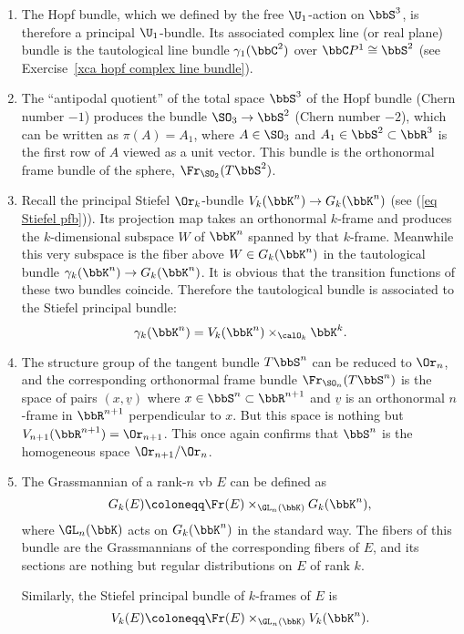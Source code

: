 \begin{example}
\begin{enumerate}
        \item The Hopf bundle, which we defined by the free $\U_1$-action on $\bbS^3$, is therefore a principal $\U_1$-bundle. Its associated complex line (or real plane) bundle is the tautological line bundle $\gamma_1(\bbC^2)$ over $\bbC P^1\cong\bbS^2$ (see Exercise~\ref{xca hopf complex line bundle}).
        
        \item The ``antipodal quotient'' of the total space $\bbS^3$ of the Hopf bundle (Chern number $-1$) produces the bundle $\SO_3\to \bbS^2$ (Chern number $-2$), which can be written as $\pi(A)=A_1$, where $A\in\SO_3$ and $A_1\in \bbS^2\subset \bbR^3$ is the first row of $A$ viewed as a unit vector. This bundle is the orthonormal frame bundle of the sphere, $\Fr_{\SO_2}(T\bbS^2)$.
        
        \item Recall the principal Stiefel $\Or_k$-bundle $V_k(\bbK^n)\to G_k(\bbK^n)$ (see (\ref{eq Stiefel pfb})). Its projection map takes an orthonormal $k$-frame and produces the $k$-dimensional subspace $W$ of $\bbK^n$ spanned by that $k$-frame. Meanwhile this very subspace is the fiber above $W\in G_k(\bbK^n)$ in the tautological bundle $\gamma_k(\bbK^n)\to G_k(\bbK^n)$. It is obvious that the transition functions of these two bundles coincide. Therefore the tautological bundle is associated to the Stiefel principal bundle:
        \[\gamma_k(\bbK^n)=V_k(\bbK^n)\times_{\calO_k}\bbK^k.\]

        \item The structure group of the tangent bundle $T\bbS^n$ can be reduced to $\Or_n$, and the corresponding orthonormal frame bundle $\Fr_{\SO_n}(T\bbS^n)$ is the space of pairs $(x,\underline{v})$ where $x\in\bbS^n\subset\bbR^{n+1}$ and $\underline{v}$ is an orthonormal $n$-frame in $\bbR^{n+1}$ perpendicular to $x$. But this space is nothing but $V_{n+1}(\bbR^{n+1})=\Or_{n+1}$. This once again confirms that $\bbS^n$ is the homogeneous space $\Or_{n+1}\slash \Or_n$.

        \item The Grassmannian of a rank-$n$ \gls{vb} $E$ can be defined as 
        \[G_k(E)\coloneqq \Fr(E)\times_{\GL_n(\bbK)} G_k(\bbK^n),\]
        where $\GL_n(\bbK)$ acts on $G_k(\bbK^n)$ in the standard way. The fibers of this bundle are the Grassmannians of the corresponding fibers of $E$, and its sections are nothing but regular distributions on $E$ of rank $k$. 
        
        Similarly, the Stiefel principal bundle of $k$-frames of $E$ is
        \[V_k(E)\coloneqq \Fr(E)\times_{\GL_n(\bbK)}V_k(\bbK^n).\]
    \end{enumerate}
\end{example}


